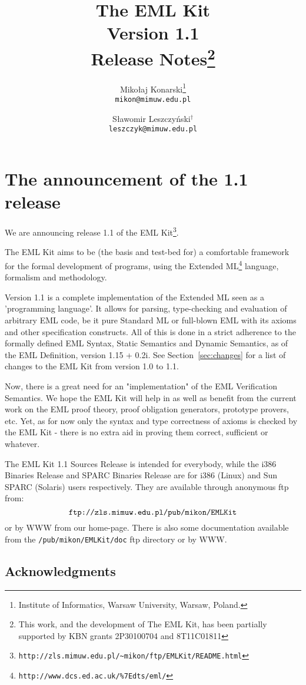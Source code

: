 \documentclass[12pt,a4paper]{article}
\title{{\bf The EML Kit\\Version 1.1}\\Release Notes\thanks{
    This work, and the development of The EML Kit, 
    has been partially supported by
    KBN grants 2P30100704 and 8T11C01811
}}
\author{
  Miko{\l}aj Konarski\thanks{
   Institute of Informatics, Warsaw University, Warsaw, Poland.}
   \\{\tt mikon@mimuw.edu.pl}
\and
 S{\l}awomir Leszczy\'nski$^\dagger$\\{\tt leszczyk@mimuw.edu.pl}}
\def\|{\verb|}
\begin{document}
\maketitle

%\tableofcontents

\section{The announcement of the 1.1 release}

We are announcing release 1.1 of the EML Kit\footnote{
\tt http://zls.mimuw.edu.pl/\~{}mikon/ftp/EMLKit/README.html}.

The EML Kit aims to be (the basis and test-bed for) a comfortable
framework for the formal development of programs, using the Extended ML\footnote{
\tt http://www.dcs.ed.ac.uk/\%7Edts/eml/} 
language, formalism and methodology.

Version 1.1 is a complete implementation of the Extended ML 
seen as a 'programming language'. It allows for parsing, type-checking 
and evaluation of arbitrary EML code, be it pure Standard ML 
or full-blown EML with its axioms and other specification constructs. 
All of this is done in a strict adherence to the formally defined EML Syntax, 
Static Semantics and Dynamic Semantics, as of the EML Definition, 
version 1.15 + 0.2i. See Section~\ref{sec:changes} for a list of changes 
to the EML Kit from version 1.0 to 1.1.

Now, there is a great need for an "implementation" 
of the EML Verification Semantics. We hope the EML Kit will help in
as well as benefit from the current work on the EML proof theory,
proof obligation generators, prototype provers, etc.
Yet, as for now only the syntax and type correctness of 
axioms is checked by the EML Kit - there is no extra aid
in proving them correct, sufficient or whatever. 

The EML Kit 1.1 Sources Release is intended for everybody, while the 
i386 Binaries Release and SPARC Binaries Release are for i386 (Linux) 
and Sun SPARC (Solaris) users respectively. They are available
through anonymous ftp from: 
$$\|ftp://zls.mimuw.edu.pl/pub/mikon/EMLKit|$$
or by WWW from our home-page. There is also some documentation 
available from the \|/pub/mikon/EMLKit/doc| ftp directory or by WWW.

\subsection*{Acknowledgments}
\end{document}
